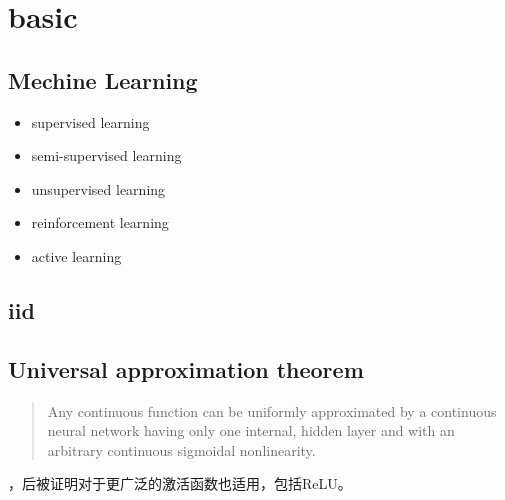 \chapter{basic}

\section{Mechine Learning}
\begin{itemize}
    \item supervised learning
    \item semi-supervised learning
    \item unsupervised learning
    \item reinforcement learning
    \item active learning
\end{itemize}

\section{iid}

\section{Universal approximation theorem}
\begin{quotation}
    Any continuous function can be uniformly approximated by a continuous neural network having only one
    internal, hidden layer and with an arbitrary continuous sigmoidal nonlinearity.\cite{Cybenko1989}
\end{quotation}
，后被证明对于更广泛的激活函数也适用\cite{Leshno1993}，包括ReLU。

